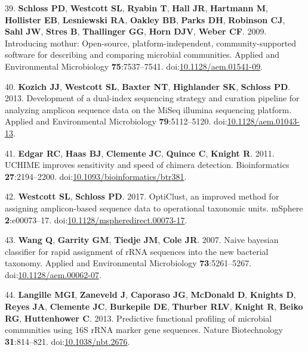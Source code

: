 \documentclass[11pt,]{article}
\begin{document}
\leavevmode\hypertarget{ref-Schloss2009}{}%
39. \textbf{Schloss PD}, \textbf{Westcott SL}, \textbf{Ryabin T},
\textbf{Hall JR}, \textbf{Hartmann M}, \textbf{Hollister EB},
\textbf{Lesniewski RA}, \textbf{Oakley BB}, \textbf{Parks DH},
\textbf{Robinson CJ}, \textbf{Sahl JW}, \textbf{Stres B},
\textbf{Thallinger GG}, \textbf{Horn DJV}, \textbf{Weber CF}. 2009.
Introducing mothur: Open-source, platform-independent,
community-supported software for describing and comparing microbial
communities. Applied and Environmental Microbiology
\textbf{75}:7537--7541.
doi:\href{https://doi.org/10.1128/aem.01541-09}{10.1128/aem.01541-09}.

\leavevmode\hypertarget{ref-Kozich2013}{}%
40. \textbf{Kozich JJ}, \textbf{Westcott SL}, \textbf{Baxter NT},
\textbf{Highlander SK}, \textbf{Schloss PD}. 2013. Development of a
dual-index sequencing strategy and curation pipeline for analyzing
amplicon sequence data on the MiSeq illumina sequencing platform.
Applied and Environmental Microbiology \textbf{79}:5112--5120.
doi:\href{https://doi.org/10.1128/aem.01043-13}{10.1128/aem.01043-13}.

\leavevmode\hypertarget{ref-Edgar2011}{}%
41. \textbf{Edgar RC}, \textbf{Haas BJ}, \textbf{Clemente JC},
\textbf{Quince C}, \textbf{Knight R}. 2011. UCHIME improves sensitivity
and speed of chimera detection. Bioinformatics \textbf{27}:2194--2200.
doi:\href{https://doi.org/10.1093/bioinformatics/btr381}{10.1093/bioinformatics/btr381}.

\leavevmode\hypertarget{ref-Westcott2017}{}%
42. \textbf{Westcott SL}, \textbf{Schloss PD}. 2017. OptiClust, an
improved method for assigning amplicon-based sequence data to
operational taxonomic units. mSphere \textbf{2}:e00073--17.
doi:\href{https://doi.org/10.1128/mspheredirect.00073-17}{10.1128/mspheredirect.00073-17}.

\leavevmode\hypertarget{ref-Wang2007}{}%
43. \textbf{Wang Q}, \textbf{Garrity GM}, \textbf{Tiedje JM},
\textbf{Cole JR}. 2007. Naive bayesian classifier for rapid assignment
of rRNA sequences into the new bacterial taxonomy. Applied and
Environmental Microbiology \textbf{73}:5261--5267.
doi:\href{https://doi.org/10.1128/aem.00062-07}{10.1128/aem.00062-07}.

\leavevmode\hypertarget{ref-Langille2013}{}%
44. \textbf{Langille MGI}, \textbf{Zaneveld J}, \textbf{Caporaso JG},
\textbf{McDonald D}, \textbf{Knights D}, \textbf{Reyes JA},
\textbf{Clemente JC}, \textbf{Burkepile DE}, \textbf{Thurber RLV},
\textbf{Knight R}, \textbf{Beiko RG}, \textbf{Huttenhower C}. 2013.
Predictive functional profiling of microbial communities using 16S rRNA
marker gene sequences. Nature Biotechnology \textbf{31}:814--821.
doi:\href{https://doi.org/10.1038/nbt.2676}{10.1038/nbt.2676}.
\end{document}
